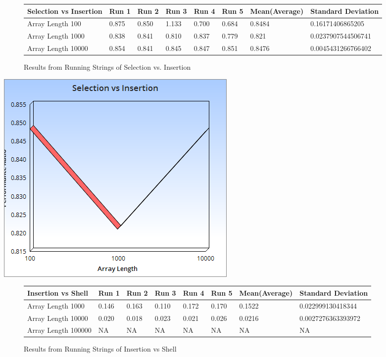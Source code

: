 \documentclass{article}
\begin{document}
\begin{figure}[H]
\centering
\begin{adjustwidth}{-3.4cm}{}
\begin{tabular}{| l | l | l | l | l | l | l | l |}
\hline
Selection vs Insertion & Run 1 & Run 2 & Run 3 & Run 4 & Run 5 & Mean(Average) & Standard Deviation\\ \hline
Array Length 100 & 0.875 & 0.850 & 1.133 & 0.700 & 0.684 & 0.8484 & 0.16171406865205 \\ \hline
Array Length 1000 & 0.838 & 0.841 & 0.810 & 0.837 & 0.779 & 0.821 & 0.0237907544506741 \\ \hline
Array Length 10000 & 0.854 & 0.841 & 0.845 & 0.847 & 0.851 & 0.8476 & 0.0045431266766402 \\ \hline
\end{tabular}
\caption{Results from Running  Strings of Selection vs. Insertion}
\end{adjustwidth}
\end{figure}
\includegraphics[scale=0.5]{String1.png}
\begin{figure}[H]
\centering
\begin{adjustwidth}{-3.4cm}{}
\begin{tabular}{| l | l | l | l | l | l | l | l |}
\hline
Insertion vs Shell & Run 1 & Run 2 & Run 3 & Run 4 & Run 5 & Mean(Average) & Standard Deviation\\ \hline
Array Length 1000 & 0.146 & 0.163 & 0.110 & 0.172 & 0.170 & 0.1522 & 0.022999130418344 \\ \hline
Array Length 10000 & 0.020 & 0.018 & 0.023 & 0.021 & 0.026 & 0.0216 & 0.0027276363393972 \\ \hline
Array Length 100000 & NA & NA & NA & NA & NA & NA & NA\\ \hline
\end{tabular}
\caption{Results from Running  Strings of Insertion vs Shell}
\end{adjustwidth}
\end{figure}
\end{document}
